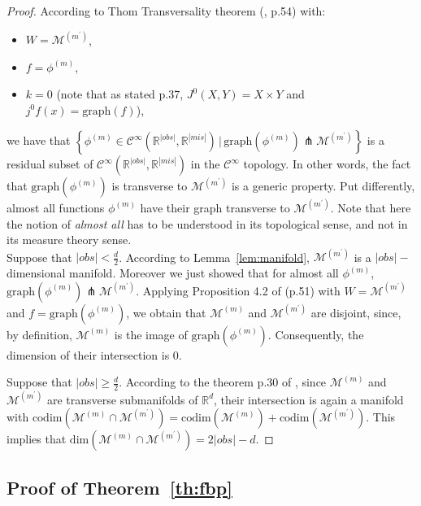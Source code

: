 \documentclass{article}
\newcommand{\RR}{\mathbb{R}}
\newcommand{\Ccal}{\mathcal{C}}
\newcommand{\Mcal}{\mathcal{M}}
\newcommand{\cbr}[1]{\left\{#1\right\}}
\theoremstyle{plain}
\begin{document}
\begin{proof}
    According to Thom Transversality theorem (\citep{Stable_mappings_book}, p.54) with:
    \begin{itemize}
        \item $W = \Mcal^{(m^\prime)}$,
        \item $f = \phi^{(m)}$,
        \item $k = 0$ (note that as stated p.37, $J^0(X, Y) = X \times Y$ and $j^0f(x) = \text{graph}(f)$),
    \end{itemize}
    we have that $\cbr{\phi^{(m)} \in \Ccal^{\infty}(\RR^{|obs|}, \RR^{|mis|})\, |\, \text{graph}(\phi^{(m)}) \pitchfork \Mcal^{(m^\prime)}}$ is a residual subset of $\Ccal^{\infty}(\RR^{|obs|}, \RR^{|mis|})$ in the $\Ccal^\infty$ topology. In other words, the fact that $\text{graph}(\phi^{(m)})$ is transverse to $\Mcal^{(m^\prime)}$ is a generic property. Put differently, almost all functions $\phi^{(m)}$ have their graph transverse to $\Mcal^{(m^\prime)}$. Note that here the notion of \emph{almost all} has to be understood in its topological sense, and not in its measure theory sense.\\
    
    Suppose that $|obs| < \frac{d}{2}$. According to Lemma~\ref{lem:manifold}, $\Mcal^{(m^\prime)}$ is a $|obs|-$dimensional manifold. Moreover we just showed that for almost all $\phi^{(m)}$, $\text{graph}(\phi^{(m)}) \pitchfork \Mcal^{(m^\prime)}$. Applying Proposition 4.2 of \citep{Stable_mappings_book} (p.51) with $W = \Mcal^{(m^\prime)}$ and $f = \text{graph}(\phi^{(m)})$, we obtain that $\Mcal^{(m)}$ and $\Mcal^{(m^\prime)}$ are disjoint, since, by definition, $\Mcal^{(m)}$ is the image of $\text{graph}(\phi^{(m)})$. Consequently, the dimension of their intersection is 0.
    
    Suppose that $|obs| \geq \frac{d}{2}$. According to the theorem p.30 of \citep{GP_book}, since $\Mcal^{(m)}$ and $\Mcal^{(m^\prime)}$ are transverse submanifolds of $\RR^d$, their intersection is again a manifold with $\text{codim}(\Mcal^{(m)} \cap \Mcal^{(m^\prime)}) = \text{codim}(\Mcal^{(m)}) + \text{codim}(\Mcal^{(m^\prime)})$. This implies that $\text{dim}(\Mcal^{(m)} \cap \Mcal^{(m^\prime)}) = 2|obs| - d$.
\end{proof}



\subsection{Proof of Theorem~\ref{th:fbp}}
\label{ss:bayes_optimality}
\end{document}
